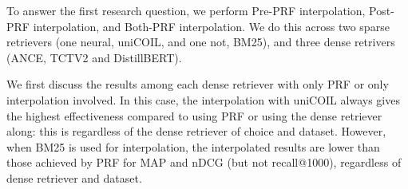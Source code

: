 %	

To answer the first research question, we perform Pre-PRF interpolation, Post-PRF interpolation, and Both-PRF interpolation. We do this across two sparse retrievers (one neural, uniCOIL, and one not, BM25), and three dense retrivers (ANCE, TCTV2 and DistillBERT).


We first discuss the results among each dense retriever with only PRF or only interpolation involved. In this case, the interpolation with uniCOIL always gives the highest effectiveness compared to using PRF or using the dense retriever along: this is regardless of the dense retriever of choice and dataset. However, when BM25 is used for interpolation, the interpolated results are lower than those achieved by PRF for MAP and nDCG (but not recall@1000), regardless of dense retriever and dataset.



